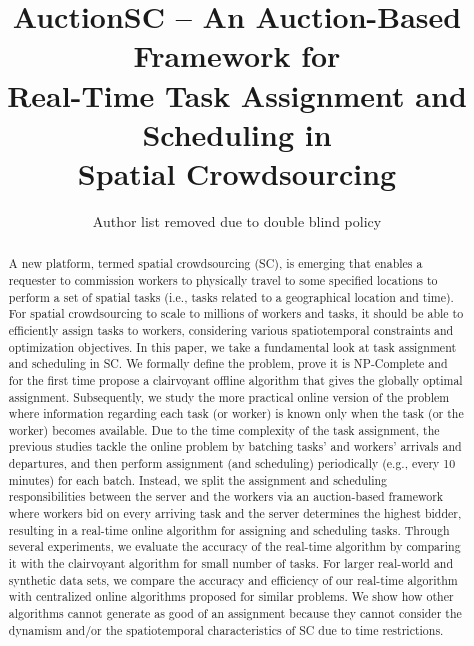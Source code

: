 \documentclass{vldb}
\title{AuctionSC -- An Auction-Based Framework for\\ Real-Time Task Assignment and Scheduling in\\ Spatial Crowdsourcing}
\begin{document}
\sloppy

\author{Author list removed due to double blind policy}

\maketitle
\begin{abstract}
A new platform, termed spatial crowdsourcing (SC), is emerging that enables a requester to commission workers to physically travel to some specified locations to perform a set of spatial tasks (i.e., tasks related to a geographical location and time).  For spatial crowdsourcing to scale to millions of workers and tasks, it should be able to efficiently assign tasks to workers, considering various spatiotemporal constraints and optimization objectives. In this paper, we take a fundamental look at task assignment and scheduling in SC. We formally define the problem, prove it is NP-Complete and for the first time propose a clairvoyant offline algorithm that gives the globally optimal assignment. Subsequently, we study the more practical online version of the problem where information regarding each task (or worker) is known only when the task (or the worker) becomes available. Due to the time complexity of the task assignment, the previous studies tackle the online problem by batching tasks' and workers' arrivals and departures, and then perform assignment (and scheduling) periodically (e.g., every 10 minutes) for each batch. Instead, we split the assignment and scheduling responsibilities between the server and the workers via an auction-based framework where workers bid on every arriving task and the server determines the highest bidder, resulting in a real-time online algorithm for assigning and scheduling tasks. Through several experiments, we evaluate the accuracy of the real-time algorithm by comparing it with the clairvoyant algorithm for small number of tasks. For larger real-world and synthetic data sets, we compare the accuracy and efficiency of our real-time algorithm with centralized online algorithms proposed for similar problems. We show how other algorithms cannot generate as good of an assignment because they cannot consider the dynamism and/or the spatiotemporal characteristics of SC due to time restrictions.

\end{abstract}
\end{document}
